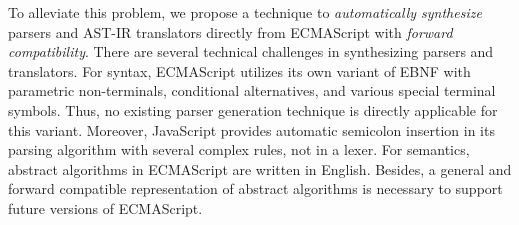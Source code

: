 To alleviate this problem, we propose a technique to \textit{automatically
synthesize} parsers and AST-IR translators directly from ECMAScript with
\textit{forward compatibility}. There are several technical challenges in
synthesizing parsers and translators. For syntax, ECMAScript utilizes its own
variant of EBNF with parametric non-terminals, conditional
alternatives, and various special terminal symbols.  Thus, no existing parser
generation technique is directly applicable for this variant.  Moreover,
JavaScript provides automatic semicolon insertion in its parsing algorithm with
several complex rules, not in a lexer. For semantics, abstract algorithms in
ECMAScript are written in English.  Besides, a general and forward compatible
representation of abstract algorithms is necessary to support future
versions of ECMAScript.

